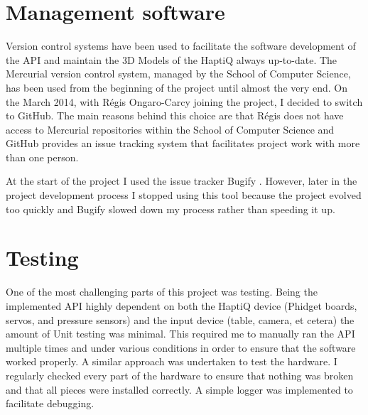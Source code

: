 \section{Management software}
Version control systems have been used to facilitate the software development of the API and maintain the 3D Models of the HaptiQ always up-to-date. The Mercurial version control system, managed by the School of Computer Science, has been used from the beginning of the project until almost the very end. On the  March 2014, with Régis Ongaro-Carcy joining the project, I decided to switch to GitHub. The main reasons behind this choice are that Régis does not have access to Mercurial repositories within the School of Computer Science and GitHub provides an issue tracking system that facilitates project work with more than one person.  

At the start of the project I used the issue tracker Bugify \cite{bugify}. However, later in the project development process I stopped using this tool because the project evolved too quickly and Bugify slowed down my process rather than speeding it up. 

\section{Testing}
One of the most challenging parts of this project was testing. Being the implemented API highly dependent on both the HaptiQ device (Phidget boards, servos, and pressure sensors) and the input device (table, camera, et cetera) the amount of Unit testing was minimal. This required me to manually ran the API multiple times and under various conditions in order to ensure that the software worked properly. A similar approach was undertaken to test the hardware. I regularly checked every part of the hardware to ensure that nothing was broken and that all pieces were installed correctly.
A simple logger was implemented to facilitate debugging.